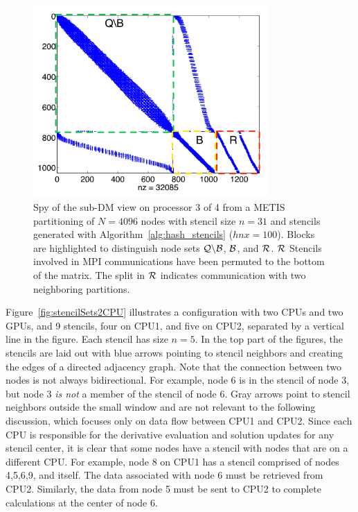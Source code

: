 \documentclass{report}
\begin{document}
\begin{figure}[ht!]
\begin{center}
\includegraphics[width=9cm]{rbffd_methods_content/decompositions/spy_metis_stencil_example_labels.png}
\caption{Spy of the sub-DM view on processor 3 of 4 from a METIS partitioning of $N=4096$ nodes with stencil size $n=31$ and stencils generated with Algorithm~\ref{alg:hash_stencils} ($hnx=100$). Blocks are highlighted to distinguish node sets $\mathcal{Q} \backslash \mathcal{B}$, $\mathcal{B}$, and $\mathcal{R}$. $\mathcal{R}$ Stencils involved in MPI communications have been permuted to the bottom of the matrix. The split in $\mathcal{R}$ indicates communication with two neighboring partitions. }
\label{fig:decomp_spy}
\end{center}
\end{figure}


Figure~\ref{fig:stencilSets2CPU} illustrates a configuration with two 
CPUs and two GPUs, and 9 stencils, four on CPU1, and five on CPU2, separated
by a vertical line in the figure. Each stencil
has size $n=5$. In the top part of the figures, the stencils are laid out
with blue arrows pointing to stencil neighbors and creating the edges of a directed adjacency graph. Note that the connection between two nodes is not 
always bidirectional. For example, node 6 is in the stencil of node 3, but 
node 3 {\em is not\/} a member of the stencil of node 6. 
Gray arrows point to stencil neighbors outside the small window and are not relevant to the following discussion, which focuses only on data flow between 
CPU1 and CPU2. 
Since each CPU is responsible for the derivative evaluation and solution updates for any stencil center, it is clear that some nodes have a stencil with nodes that are on a different CPU. For example, node 8 on CPU1 has a stencil comprised of
nodes 4,5,6,9, and itself. The data associated with node 6 must be retrieved
from CPU2. Similarly, the data from node 5 must be sent to CPU2 to 
complete calculations at the center of node 6.
\end{document}
